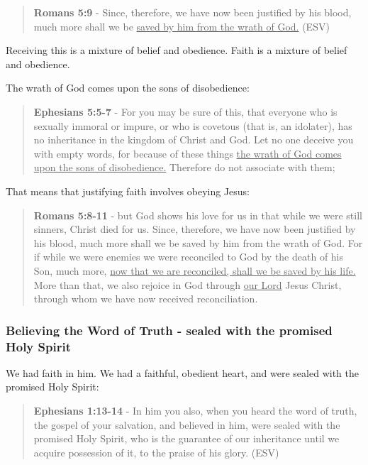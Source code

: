 \documentclass[11pt]{article}
\begin{document}
\begin{quote}
\textbf{Romans 5:9} - Since, therefore, we have now been justified by his blood, much more shall we be \uline{saved by him from the wrath of God.} (ESV)
\end{quote}

Receiving this is a mixture of belief and obedience.
Faith is a mixture of belief and obedience.

The wrath of God comes upon the sons of disobedience:

\begin{quote}
\textbf{Ephesians 5:5-7} - For you may be sure of this, that everyone who is sexually immoral or impure, or who is covetous (that is, an idolater), has no inheritance in the kingdom of Christ and God. Let no one deceive you with empty words, for because of these things \uline{the wrath of God comes upon the sons of disobedience.} Therefore do not associate with them;
\end{quote}

That means that justifying faith involves obeying Jesus:

\begin{quote}
\textbf{Romans 5:8-11} - but God shows his love for us in that while we were still sinners, Christ died for us. Since, therefore, we have now been justified by his blood, much more shall we be saved by him from the wrath of God. For if while we were enemies we were reconciled to God by the death of his Son, much more, \uline{now that we are reconciled, shall we be saved by his life.} More than that, we also rejoice in God through \uline{our Lord} Jesus Christ, through whom we have now received reconciliation.
\end{quote}

\subsubsection{Believing the Word of Truth - sealed with the promised Holy Spirit}
\label{sec:orgad0c428}
We had faith in him. We had a faithful, obedient heart, and were sealed with the promised Holy Spirit:

\begin{quote}
\textbf{Ephesians 1:13-14} - In him you also, when you heard the word of truth, the gospel of your salvation, and believed in him, were sealed with the promised Holy Spirit, who is the guarantee of our inheritance until we acquire possession of it, to the praise of his glory. (ESV)
\end{quote}
\end{document}

